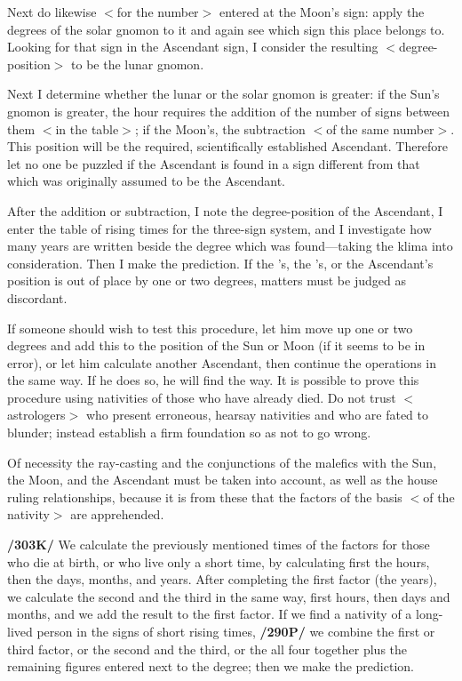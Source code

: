 Next do likewise $<$for the number$>$ entered at the Moon’s sign: apply the degrees of the solar gnomon to it and again see which sign this place belongs to. Looking for that sign in the Ascendant sign, I
consider the resulting $<$degree-position$>$ to be the lunar gnomon.

Next I determine whether the lunar or the solar gnomon is greater: if the Sun’s gnomon is greater, the hour requires the addition of the number of signs between them $<$in the table$>$; if the Moon’s, the
subtraction $<$of the same number$>$. This position will be the required, scientifically established Ascendant. Therefore let no one be puzzled if the Ascendant is found in a sign different from that which was originally assumed to be the Ascendant. 

After the addition or subtraction, I note the degree-position of the
Ascendant, I enter the table of rising times for the three-sign system, and I investigate how many years are written beside the degree which was found—taking the klima into consideration. Then I make the
prediction. If the \Sun’s, the \Moon’s, or the Ascendant’s position is out of place by one or two degrees, matters must be judged as discordant.

If someone should wish to test this procedure, let him move up one or two degrees and add this to the position of the Sun or Moon (if it seems to be in error), or let him calculate another Ascendant, then
continue the operations in the same way. If he does so, he will find the way. It is possible to prove this procedure using nativities of those who have already died. Do not trust $<$astrologers$>$ who present
erroneous, hearsay nativities and who are fated to blunder; instead establish a firm foundation so as not to go wrong.

Of necessity the ray-casting and the conjunctions of the malefics with the Sun, the Moon, and the Ascendant must be taken into account, as well as the house ruling relationships, because it is from these
that the factors of the basis $<$of the nativity$>$ are apprehended.

\textbf{/303K/} We calculate the previously mentioned times of the factors for those who die at birth, or who live only a short time, by calculating first the hours, then the days, months, and years. After completing the first factor (the years), we calculate the second and the third in the same way, first hours, then days and months, and we add the result to the first factor. If we find a nativity of a long-lived person in the signs of short rising times, \textbf{/290P/} we combine the first or third factor, or the second and the third, or the all four together plus the remaining figures entered next to the degree; then we make the prediction.

